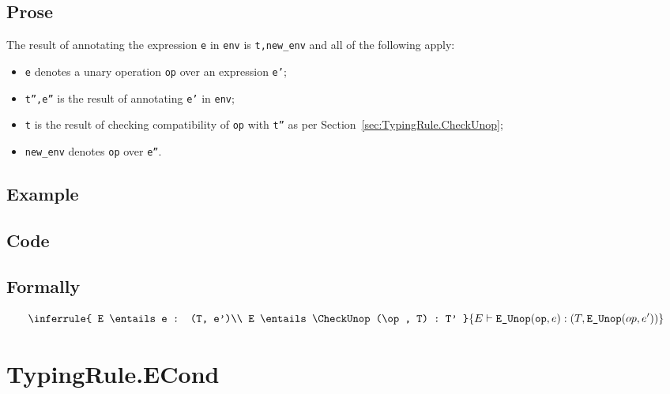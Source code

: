 \documentclass{book}
\begin{document}
  \subsection{Prose}
  The result of annotating the expression \texttt{e} in \texttt{env} is
\texttt{t,new\_env} and all of the following apply:
  \begin{itemize}
  \item \texttt{e} denotes a unary operation \texttt{op} over an expression \texttt{e'};
  \item \texttt{t'',e''} is the result of annotating \texttt{e'} in \texttt{env};
  \item \texttt{t} is the result of checking compatibility of \texttt{op} with \texttt{t''} as per Section~\ref{sec:TypingRule.CheckUnop};
  \item \texttt{new\_env} denotes \texttt{op} over \texttt{e''}.
  \end{itemize}

  \subsection{Example}

  \subsection{Code}

\begin{emptyformal}
    \subsection{Formally}
\[
\inferrule{
  E \entails e : (T, e')\\
  E \entails \CheckUnop(\op, T) : T'
  }
{E \entails \texttt{E\_Unop}(\op, e) : (T, \texttt{E\_Unop}(op, e'))}
\]
\end{emptyformal}


\section{TypingRule.ECond \label{sec:TypingRule.ECond}}
\end{document}

